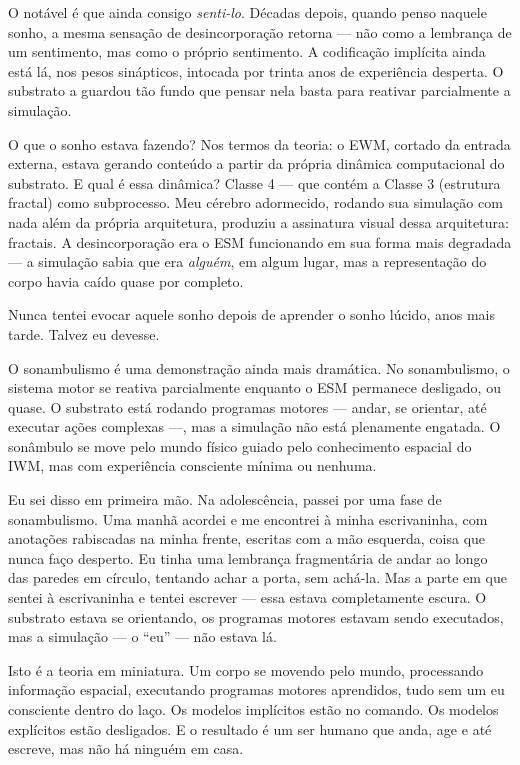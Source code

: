 \documentclass[11pt, twoside, openright]{book}
\begin{document}
O notável é que ainda consigo \textit{senti-lo}. Décadas depois, quando penso naquele sonho, a mesma sensação de desincorporação retorna --- não como a lembrança de um sentimento, mas como o próprio sentimento. A codificação implícita ainda está lá, nos pesos sinápticos, intocada por trinta anos de experiência desperta. O substrato a guardou tão fundo que pensar nela basta para reativar parcialmente a simulação.

O que o sonho estava fazendo? Nos termos da teoria: o EWM, cortado da entrada externa, estava gerando conteúdo a partir da própria dinâmica computacional do substrato. E qual é essa dinâmica? Classe 4 --- que contém a Classe 3 (estrutura fractal) como subprocesso. Meu cérebro adormecido, rodando sua simulação com nada além da própria arquitetura, produziu a assinatura visual dessa arquitetura: fractais. A desincorporação era o ESM funcionando em sua forma mais degradada --- a simulação sabia que era \textit{alguém}, em algum lugar, mas a representação do corpo havia caído quase por completo.

Nunca tentei evocar aquele sonho depois de aprender o sonho lúcido, anos mais tarde. Talvez eu devesse.

O sonambulismo é uma demonstração ainda mais dramática. No sonambulismo, o sistema motor se reativa parcialmente enquanto o ESM permanece desligado, ou quase. O substrato está rodando programas motores --- andar, se orientar, até executar ações complexas ---, mas a simulação não está plenamente engatada. O sonâmbulo se move pelo mundo físico guiado pelo conhecimento espacial do IWM, mas com experiência consciente mínima ou nenhuma.

Eu sei disso em primeira mão. Na adolescência, passei por uma fase de sonambulismo. Uma manhã acordei e me encontrei à minha escrivaninha, com anotações rabiscadas na minha frente, escritas com a mão esquerda, coisa que nunca faço desperto. Eu tinha uma lembrança fragmentária de andar ao longo das paredes em círculo, tentando achar a porta, sem achá-la. Mas a parte em que sentei à escrivaninha e tentei escrever --- essa estava completamente escura. O substrato estava se orientando, os programas motores estavam sendo executados, mas a simulação --- o ``eu'' --- não estava lá.

Isto é a teoria em miniatura. Um corpo se movendo pelo mundo, processando informação espacial, executando programas motores aprendidos, tudo sem um eu consciente dentro do laço. Os modelos implícitos estão no comando. Os modelos explícitos estão desligados. E o resultado é um ser humano que anda, age e até escreve, mas não há ninguém em casa.
\end{document}
